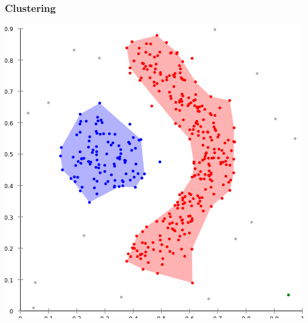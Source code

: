 \begin{frame}
    \frametitle{Clustering}
    \endblock{}
		\begin{center}
    \includegraphics[height=0.8\textheight]{FIGURES/DBSCAN-density-data}
		\end{center}
\end{frame}

